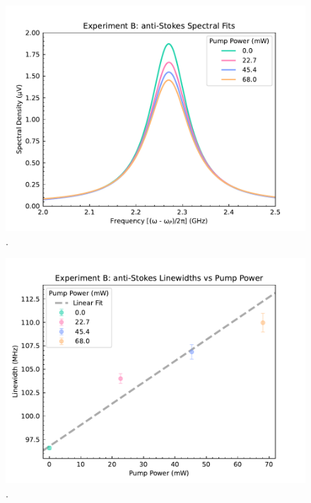 \begin{figure}[t]
  \centering
  \includegraphics[width=\textwidth]{figs/3-Cooling/P-P anti-Stokes Fits.pdf}
  \caption{.}
  \label{fig:Cooling:P-P anti-Stokes Fits}
\end{figure}

\begin{figure}[t]
  \centering
  \includegraphics[width=\textwidth]{figs/3-Cooling/P-P anti-Stokes Wid v Pow.pdf}
  \caption{.}
  \label{fig:Cooling:P-P anti-Stokes Wid v Pow}
\end{figure}


